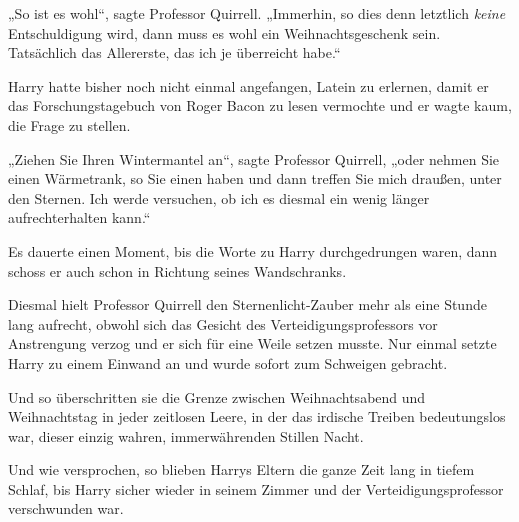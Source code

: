 „So ist es wohl“, sagte Professor Quirrell.
„Immerhin, so dies denn letztlich \emph{keine} Entschuldigung wird, dann muss es wohl ein Weihnachtsgeschenk sein. Tatsächlich das Allererste, das ich je überreicht habe.“

Harry hatte bisher noch nicht einmal angefangen, Latein zu erlernen, damit er das Forschungstagebuch von Roger Bacon zu lesen vermochte und er wagte kaum, die Frage zu stellen.

„Ziehen Sie Ihren Wintermantel an“, sagte Professor Quirrell, „oder nehmen Sie einen Wärmetrank, so Sie einen haben und dann treffen Sie mich draußen, unter den Sternen. Ich werde versuchen, ob ich es diesmal ein wenig länger aufrechterhalten kann.“

Es dauerte einen Moment, bis die Worte zu Harry durchgedrungen waren, dann schoss er auch schon in Richtung seines Wandschranks.

Diesmal hielt Professor Quirrell den Sternenlicht-Zauber mehr als eine Stunde lang aufrecht, obwohl sich das Gesicht des Verteidigungsprofessors vor Anstrengung verzog und er sich für eine Weile setzen musste. Nur einmal setzte Harry zu einem Einwand an und wurde sofort zum Schweigen gebracht.

Und so überschritten sie die Grenze zwischen Weihnachtsabend und Weihnachtstag in jeder zeitlosen Leere, in der das irdische Treiben bedeutungslos war, dieser einzig wahren, immerwährenden Stillen Nacht.

Und wie versprochen, so blieben Harrys Eltern die ganze Zeit lang in tiefem Schlaf, bis Harry sicher wieder in seinem Zimmer und der Verteidigungsprofessor verschwunden war.
